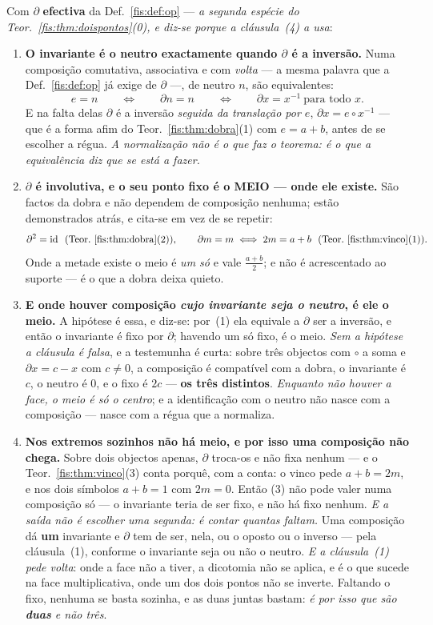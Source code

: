 \documentclass[livro.tex]{subfiles}
\begin{document}
\begin{teorema}\label{fis:thm:duas}
Com $\partial$ \textbf{efectiva} da Def.~\ref{fis:def:op} --- \emph{a segunda
espécie do Teor.~\ref{fis:thm:doispontos}(0), e diz-se porque a cláusula~(4) a
usa}:
\begin{enumerate}\itemsep3pt
\item[(1)] \textbf{O invariante é o neutro exactamente quando $\partial$ é a
inversão.} Numa composição comutativa, associativa e com \emph{volta} --- a mesma
palavra que a Def.~\ref{fis:def:op} já exige de $\partial$ ---, de neutro $n$,
são equivalentes:
\[
e=n
\qquad\Longleftrightarrow\qquad
\partial n=n
\qquad\Longleftrightarrow\qquad
\partial x=x^{-1}\ \text{para todo }x .
\]
E na falta delas $\partial$ é a inversão \emph{seguida da translação por $e$},
$\partial x=e\circ x^{-1}$ --- que é a forma afim do Teor.~\ref{fis:thm:dobra}(1) com $e=a+b$, antes
de se escolher a régua. \emph{A normalização não é o que faz o teorema: é o que a
equivalência diz que se está a fazer.}
\item[(2)] \textbf{$\partial$ é involutiva, e o seu ponto fixo é o MEIO --- onde
ele existe.} São factos da dobra e não dependem de composição nenhuma; estão
demonstrados atrás, e cita-se em vez de se repetir:
\[
\partial^{2}=\mathrm{id}\ \ (\text{Teor.~\ref{fis:thm:dobra}}(2)),
\qquad
\partial m=m\iff 2m=a+b\ \ (\text{Teor.~\ref{fis:thm:vinco}}(1)) .
\]
Onde a metade existe o meio é \emph{um só} e vale $\tfrac{a+b}{2}$; e não é
acrescentado ao suporte --- é o que a dobra deixa quieto.
\item[(3)] \textbf{E onde houver composição \emph{cujo invariante seja o
neutro}, é ele o meio.} A hipótese é essa, e diz-se: por~(1) ela equivale a
$\partial$ ser a inversão, e então o invariante é fixo por $\partial$; havendo um
só fixo, é o meio. \emph{Sem a hipótese a cláusula é falsa}, e a testemunha é
curta: sobre três objectos com $\circ$ a soma e $\partial x=c-x$ com $c\neq0$, a
composição é compatível com a dobra, o invariante é $c$, o neutro é $0$, e o
fixo é $2c$ --- \textbf{os três distintos}. \emph{Enquanto não houver a face, o
meio é só o centro}; e a identificação com o neutro não nasce com a composição
--- nasce com a régua que a normaliza.
\item[(4)] \textbf{Nos extremos sozinhos não há meio, e por isso uma composição
não chega.} Sobre dois objectos apenas, $\partial$ troca-os e não fixa nenhum ---
e o Teor.~\ref{fis:thm:vinco}(3) conta porquê, com a conta: o vinco pede
$a+b=2m$, e nos dois símbolos $a+b=1$ com $2m=0$. Então (3) não pode valer numa
composição só --- o invariante teria de ser fixo, e não há fixo nenhum.
\smallskip\noindent\emph{E a saída não é escolher uma segunda: é contar quantas
faltam.} Uma composição dá \textbf{um} invariante e $\partial$ tem de ser, nela,
ou o oposto ou o inverso --- pela cláusula~(1), conforme o invariante seja ou não
o neutro. \emph{E a cláusula~(1) pede volta}: onde a face não a tiver, a
dicotomia não se aplica, e é o que sucede na face multiplicativa, onde um dos
dois pontos não se inverte. Faltando o fixo, nenhuma se basta sozinha, e as duas
juntas bastam: \emph{é por isso que são \textbf{duas} e não três}.


\end{enumerate}
\end{teorema}
\end{document}
